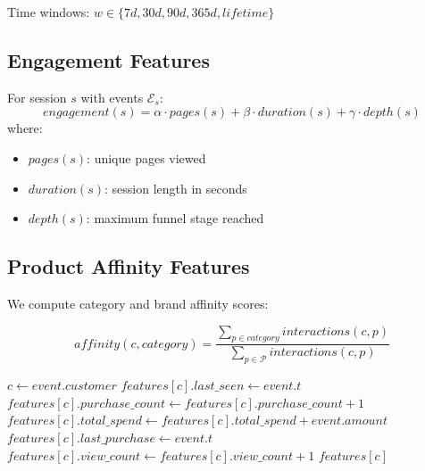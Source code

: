 Time windows: $w \in \{7d, 30d, 90d, 365d, lifetime\}$

\subsection{Engagement Features}

\begin{definition}
For session $s$ with events $\mathcal{E}_s$:
\begin{equation}
engagement(s) = \alpha \cdot pages(s) + \beta \cdot duration(s) + \gamma \cdot depth(s)
\end{equation}
where:
\begin{itemize}
    \item $pages(s)$: unique pages viewed
    \item $duration(s)$: session length in seconds
    \item $depth(s)$: maximum funnel stage reached
\end{itemize}
\end{definition}

\subsection{Product Affinity Features}

We compute category and brand affinity scores:

\begin{equation}
affinity(c, category) = \frac{\sum_{p \in category} interactions(c, p)}{\sum_{p \in \mathcal{P}} interactions(c, p)}
\end{equation}

\begin{algorithm}
\caption{Real-Time Feature Computation}
\begin{algorithmic}[1]
    \State $c \gets event.customer$
    \State $features[c].last\_seen \gets event.t$
        \State $features[c].purchase\_count \gets features[c].purchase\_count + 1$
        \State $features[c].total\_spend \gets features[c].total\_spend + event.amount$
        \State $features[c].last\_purchase \gets event.t$
        \State $features[c].view\_count \gets features[c].view\_count + 1$
        \State {}
    \EndIf
    \State {}
    \State \Return $features[c]$
\EndFunction
\end{algorithmic}
\end{algorithm}

